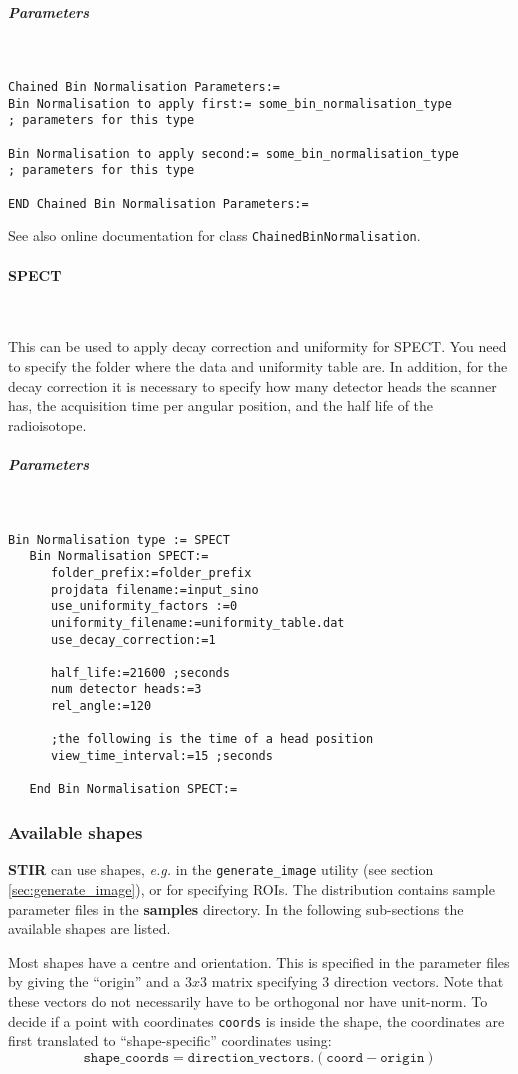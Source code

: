 \documentclass{article}
\newcommand{\subsubsubsection}[1]{\paragraph{#1}\mbox{} \\}
\newcommand{\subsubsubsubsection}[1]{\subparagraph{#1} \mbox{} \\}
\begin{document}
{{{ \subsubsubsubsection{Parameters}
}
\begin{verbatim}
Chained Bin Normalisation Parameters:=
Bin Normalisation to apply first:= some_bin_normalisation_type
; parameters for this type

Bin Normalisation to apply second:= some_bin_normalisation_type
; parameters for this type

END Chained Bin Normalisation Parameters:=
\end{verbatim}

See also online documentation for class \texttt{ChainedBinNormalisation}.

{ \subsubsubsection{SPECT }
}
\label{sec:SPECTbinnormalisation}
This can be used to apply decay correction and uniformity for SPECT. You need to specify the folder where the data and uniformity table are. In addition, for the decay correction it is necessary to specify how many detector heads the scanner has, the acquisition time per angular position, and  the half life of the radioisotope.

{ \subsubsubsubsection{Parameters}
}
\begin{verbatim}
Bin Normalisation type := SPECT
   Bin Normalisation SPECT:=
      folder_prefix:=folder_prefix
      projdata filename:=input_sino
      use_uniformity_factors :=0
      uniformity_filename:=uniformity_table.dat
      use_decay_correction:=1
     
      half_life:=21600 ;seconds
      num detector heads:=3
      rel_angle:=120
      
      ;the following is the time of a head position
      view_time_interval:=15 ;seconds

   End Bin Normalisation SPECT:=
\end{verbatim}


\subsubsection{
Available shapes}
\label{sec:shapes}
\textbf{STIR} can use shapes, \textit{e.g.} in the \texttt{generate\_image}
utility (see section \ref{sec:generate_image}), or for specifying ROIs. The distribution contains sample parameter files in the
\textbf{samples} directory. In the following sub-sections the available shapes are listed.

Most shapes have a centre and orientation. This is specified in the parameter files
by giving the ``origin'' and a $3x3$ matrix specifying $3$ direction vectors.
Note that these vectors do not necessarily have to be orthogonal nor have unit-norm.
To decide if a point with coordinates \texttt{coords} is inside the shape, the
coordinates are first translated to ``shape-specific'' coordinates using:
\[
\mathtt{shape\_coords} = \mathtt{direction\_vectors}. (\mathtt{coord}-\mathtt{origin})
\]

}}
\end{document}
